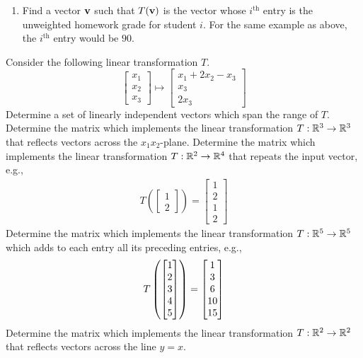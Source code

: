 \begin{tasks}[resume, style=enumerate]
\begin{enumerate}[label=(\alph*)]
    $i^\text{th}$ student.  For example, if the $i^\text{th}$ student
    received $90$ percent on every homework assignment, $85$ percent
    on the midterm, and $92$ percent on the final, then the
    $i^\text{th}$ entry of the output vector should be $90 * 0.5 + 85
    * 0.2 + 92 * 0.3$.
  \item
    Find a vector $\mathbf v$ such that $T(\mathbf v)$ is the vector
    whose $i^\text{th}$ entry is the unweighted homework grade for
    student $i$. For the same example as above, the $i^\text{th}$
    entry would be $90$.
  \end{enumerate}
\task
  Consider the following linear transformation $T$.
  \begin{displaymath}
    \begin{bmatrix}
      x_1 \\ x_2 \\ x_3
    \end{bmatrix}
    \mapsto
    \begin{bmatrix}
      x_1 + 2x_2 - x_3 \\
      x_3 \\
      2x_3
    \end{bmatrix}
  \end{displaymath}
  Determine a set of linearly independent vectors which span the range
  of $T$.
\task
  Determine the matrix which implements the linear transformation $T :
  \mathbb R^3 \to \mathbb R^3$ that reflects vectors across the $x_1x_2$-plane.
\task
  Determine the matrix which implements the linear transformation $T :
  \mathbb R^2 \to \mathbb R^4$ that repeats the input vector, e.g.,
  \begin{align*}
    T\left(\begin{bmatrix} 1 \\ 2 \end{bmatrix} \right)
    = \begin{bmatrix} 1 \\ 2 \\ 1 \\ 2 \end{bmatrix}
  \end{align*}
\task
  Determine the matrix which implements the linear transformation $T :
  \mathbb R^5 \to \mathbb R^5$ which adds to each entry all its preceding entries,
  e.g.,
  \begin{displaymath}
    T\left( \begin{bmatrix} 1 \\ 2 \\ 3 \\ 4 \\ 5 \end{bmatrix}  \right) =
     \begin{bmatrix} 1 \\ 3 \\ 6 \\ 10 \\ 15 \end{bmatrix} 
  \end{displaymath}
\task
  Determine the matrix which implements the linear transformation $T :
  \mathbb R^2 \to \mathbb R^2$ that reflects vectors across the line $y = x$.

\end{tasks}
